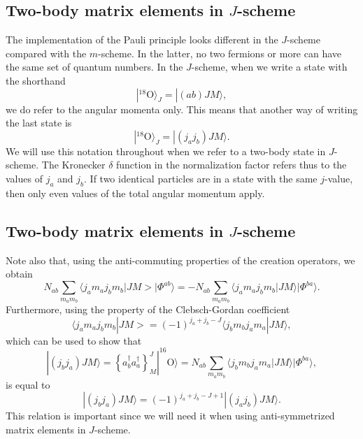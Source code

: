 \documentclass[%
twoside,                 %
final,                   %
10pt]{article}
\begin{document}
\subsection{Two-body matrix elements in $J$-scheme}
\begin{block}{}
The implementation of the Pauli principle looks different in the $J$-scheme compared with the $m$-scheme. In the latter, no two fermions or more can have the same set of quantum numbers. In the $J$-scheme, when we write a state with the shorthand 
\[
|^{18}\mathrm{O}\rangle_J =|(ab)JM\rangle,
\]
we do refer to the angular momenta only. This means that another way of writing the last state is
\[
|^{18}\mathrm{O}\rangle_J =|(j_aj_b)JM\rangle.
\]
We will use this notation throughout when we refer to a two-body state in $J$-scheme. The Kronecker $\delta$ function in the normalization factor 
refers thus to the values of $j_a$ and $j_b$. If two identical particles are in a state with the same $j$-value, then only even values of the total angular momentum apply.
\end{block}


\subsection{Two-body matrix elements in $J$-scheme}
\begin{block}{}
Note also that, using the anti-commuting properties of the creation operators, we obtain
\[
N_{ab}\sum_{m_am_b}\langle j_am_aj_bm_b|JM>|\Phi^{ab}\rangle=-N_{ab}\sum_{m_am_b}\langle j_am_aj_bm_b|JM\rangle|\Phi^{ba}\rangle.
\]
Furthermore, using the property of the Clebsch-Gordan coefficient
\[
\langle j_am_aj_bm_b|JM>=(-1)^{j_a+j_b-J}\langle j_bm_bj_am_a|JM\rangle,
\]
which can be used to show that
\[
|(j_bj_a)JM\rangle  = \left\{a^{\dagger}_ba^{\dagger}_a\right\}^J_M|^{16}\mathrm{O}\rangle=N_{ab}\sum_{m_am_b}\langle j_bm_bj_am_a|JM\rangle|\Phi^{ba}\rangle, 
\]
is equal to 
\[
|(j_bj_a)JM\rangle=(-1)^{j_a+j_b-J+1}|(j_aj_b)JM\rangle.
\]
This relation is important since we will need it when using anti-symmetrized matrix elements in $J$-scheme.
\end{block}

\end{document}
